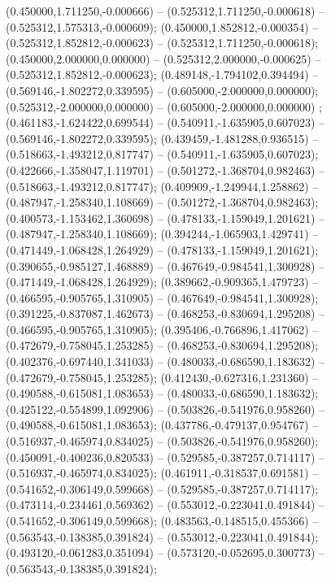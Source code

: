  (0.450000,1.711250,-0.000666) -- (0.525312,1.711250,-0.000618) -- (0.525312,1.575313,-0.000609);
 (0.450000,1.852812,-0.000354) -- (0.525312,1.852812,-0.000623) -- (0.525312,1.711250,-0.000618);
 (0.450000,2.000000,0.000000) -- (0.525312,2.000000,-0.000625) -- (0.525312,1.852812,-0.000623);
 (0.489148,-1.794102,0.394494) -- (0.569146,-1.802272,0.339595) -- (0.605000,-2.000000,0.000000);
 (0.525312,-2.000000,0.000000) -- (0.605000,-2.000000,0.000000) ;
 (0.461183,-1.624422,0.699544) -- (0.540911,-1.635905,0.607023) -- (0.569146,-1.802272,0.339595);
 (0.439459,-1.481288,0.936515) -- (0.518663,-1.493212,0.817747) -- (0.540911,-1.635905,0.607023);
 (0.422666,-1.358047,1.119701) -- (0.501272,-1.368704,0.982463) -- (0.518663,-1.493212,0.817747);
 (0.409909,-1.249944,1.258862) -- (0.487947,-1.258340,1.108669) -- (0.501272,-1.368704,0.982463);
 (0.400573,-1.153462,1.360698) -- (0.478133,-1.159049,1.201621) -- (0.487947,-1.258340,1.108669);
 (0.394244,-1.065903,1.429741) -- (0.471449,-1.068428,1.264929) -- (0.478133,-1.159049,1.201621);
 (0.390655,-0.985127,1.468889) -- (0.467649,-0.984541,1.300928) -- (0.471449,-1.068428,1.264929);
 (0.389662,-0.909365,1.479723) -- (0.466595,-0.905765,1.310905) -- (0.467649,-0.984541,1.300928);
 (0.391225,-0.837087,1.462673) -- (0.468253,-0.830694,1.295208) -- (0.466595,-0.905765,1.310905);
 (0.395406,-0.766896,1.417062) -- (0.472679,-0.758045,1.253285) -- (0.468253,-0.830694,1.295208);
 (0.402376,-0.697440,1.341033) -- (0.480033,-0.686590,1.183632) -- (0.472679,-0.758045,1.253285);
 (0.412430,-0.627316,1.231360) -- (0.490588,-0.615081,1.083653) -- (0.480033,-0.686590,1.183632);
 (0.425122,-0.554899,1.092906) -- (0.503826,-0.541976,0.958260) -- (0.490588,-0.615081,1.083653);
 (0.437786,-0.479137,0.954767) -- (0.516937,-0.465974,0.834025) -- (0.503826,-0.541976,0.958260);
 (0.450091,-0.400236,0.820533) -- (0.529585,-0.387257,0.714117) -- (0.516937,-0.465974,0.834025);
 (0.461911,-0.318537,0.691581) -- (0.541652,-0.306149,0.599668) -- (0.529585,-0.387257,0.714117);
 (0.473114,-0.234461,0.569362) -- (0.553012,-0.223041,0.491844) -- (0.541652,-0.306149,0.599668);
 (0.483563,-0.148515,0.455366) -- (0.563543,-0.138385,0.391824) -- (0.553012,-0.223041,0.491844);
 (0.493120,-0.061283,0.351094) -- (0.573120,-0.052695,0.300773) -- (0.563543,-0.138385,0.391824);
